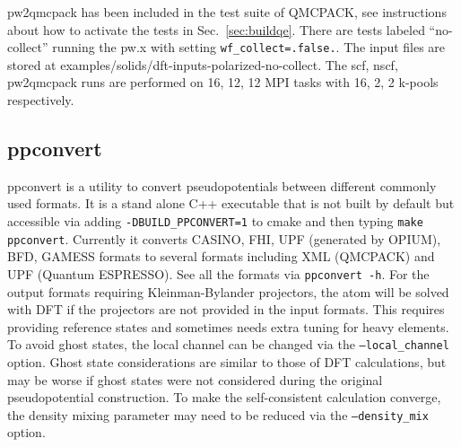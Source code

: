 pw2qmcpack has been included in the test suite of QMCPACK, see instructions about how to activate the tests in Sec.~\ref{sec:buildqe}.
There are tests labeled ``no-collect'' running the pw.x with setting \texttt{wf\_collect=.false.}.
The input files are stored at examples/solids/dft-inputs-polarized-no-collect.
The scf, nscf, pw2qmcpack runs are performed on 16, 12, 12 MPI tasks with 16, 2, 2 k-pools respectively.


  \subsection{ppconvert}
    \label{sec:ppconvert}
    ppconvert is a utility to convert pseudopotentials between different commonly used formats.
    It is a stand alone C++ executable that is not built by default but accessible via adding
    \texttt{-DBUILD\_PPCONVERT=1} to cmake and then typing \texttt{make ppconvert}.
    Currently it converts CASINO, FHI, UPF (generated by OPIUM), BFD, GAMESS formats to several formats
    including XML (QMCPACK) and UPF (Quantum ESPRESSO). See all the formats via \texttt{ppconvert -h}.
    For the output formats requiring Kleinman-Bylander projectors, the atom will be solved with DFT
    if the projectors are not provided in the input formats.
    This requires providing reference states and sometimes needs extra tuning for heavy elements.
    To avoid ghost states, the local channel can be changed via the \texttt{--local\_channel} option. Ghost state considerations are similar to those of DFT calculations, but may be worse if ghost states were not considered during the original pseudopotential construction.
    To make the self-consistent calculation converge, the density mixing parameter may need to be reduced
    via the \texttt{--density\_mix} option.

